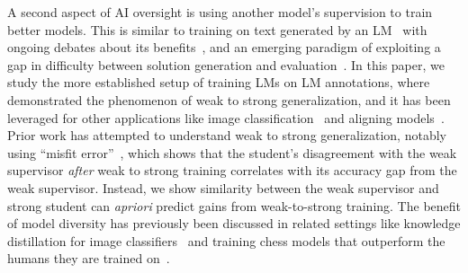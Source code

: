 A second aspect of AI oversight is using another model's supervision to train better models. This is similar to training on text generated by an LM~\citep{vicuna2023} with ongoing debates about its benefits~\citep{kazdan2024collapsethriveperilspromises}, and an emerging paradigm of exploiting a gap in difficulty between solution generation and evaluation~\citep{song2024mindgapexaminingselfimprovement}. In this paper, we study the more established setup of training LMs on LM annotations, where~\citet{burns2024weaktostrong} demonstrated the phenomenon of weak to strong generalization, and it has been leveraged for other applications like image classification~\citep{guo2024visionsuperalignmentweaktostronggeneralization} and aligning models~\citep{zhu2024weaktostrongpreferenceoptimizationstealing}. Prior work has attempted to understand weak to strong generalization, notably using ``misfit error''~\citep{charikar2024quantifyinggainweaktostronggeneralization}, which shows that the student's disagreement with the weak supervisor \textit{after} weak to strong training correlates with its accuracy gap from the weak supervisor. Instead, we show similarity between the weak supervisor and strong student can \textit{apriori} predict gains from weak-to-strong training. The benefit of model diversity has previously been discussed in related settings like knowledge distillation for image classifiers~\citep{roth2024fantastic} and training chess models that outperform the humans they are trained on~\citep{zhang2024transcendence}.